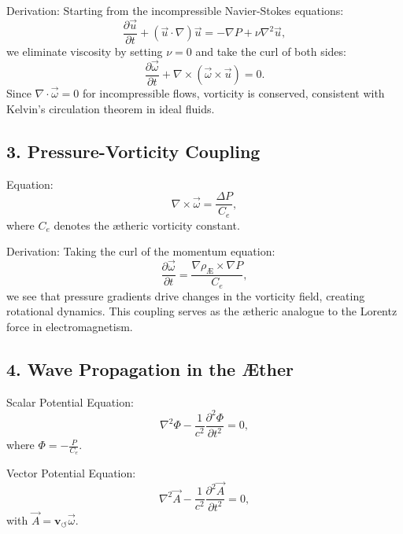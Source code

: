         Derivation:
        Starting from the incompressible Navier-Stokes equations:
        \begin{equation*}
            \frac{\partial \vec{u}}{\partial t} + (\vec{u} \cdot \nabla) \vec{u} = -\nabla P + \nu \nabla^2 \vec{u},
        \end{equation*}
        we eliminate viscosity by setting $\nu = 0$ and take the curl of both sides:
        \begin{equation*}
            \frac{\partial \vec{\omega}}{\partial t} + \nabla \times (\vec{\omega} \times \vec{u}) = 0.
        \end{equation*}
        Since $\nabla \cdot \vec{\omega} = 0$ for incompressible flows, vorticity is conserved, consistent with Kelvin's circulation theorem in ideal fluids.

        \subsection*{3. Pressure-Vorticity Coupling}
        Equation:
        \begin{equation*}
            \nabla \times \vec{\omega} = \frac{\Delta P}{C_e},
        \end{equation*}
        where $C_e$ denotes the ætheric vorticity constant.

        Derivation:
        Taking the curl of the momentum equation:
        \begin{equation*}
            \frac{\partial \vec{\omega}}{\partial t} = \frac{\nabla \rho_\text{Æ} \times \nabla P}{C_e},
        \end{equation*}
        we see that pressure gradients drive changes in the vorticity field, creating rotational dynamics. This coupling serves as the ætheric analogue to the Lorentz force in electromagnetism.

        \subsection*{4. Wave Propagation in the Æther}
        Scalar Potential Equation:
        \begin{equation*}
            \nabla^2 \Phi - \frac{1}{c^2} \frac{\partial^2 \Phi}{\partial t^2} = 0,
        \end{equation*}
        where $\Phi = -\frac{P}{C_e}$.

        Vector Potential Equation:
        \begin{equation*}
            \nabla^2 \vec{A} - \frac{1}{c^2} \frac{\partial^2 \vec{A}}{\partial t^2} = 0,
        \end{equation*}
        with $\vec{A} = \mathbf{v}_{\scriptscriptstyle\boldsymbol{\circlearrowleft}} \vec{\omega}$.

